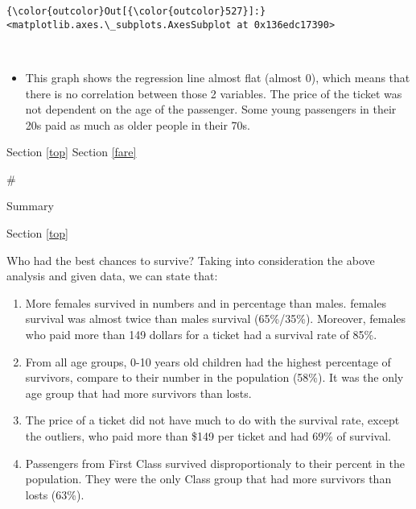 \documentclass[11pt]{article}
\providecommand{\tightlist}{%
      \setlength{\itemsep}{0pt}\setlength{\parskip}{0pt}}
\begin{document}
\begin{Verbatim}[commandchars=\\\{\}]
{\color{outcolor}Out[{\color{outcolor}527}]:} <matplotlib.axes.\_subplots.AxesSubplot at 0x136edc17390>
\end{Verbatim}
            
    \begin{center}
    \end{center}
    { \hspace*{\fill} \\}
    
    \begin{itemize}
\tightlist
\item
  This graph shows the regression line almost flat (almost 0), which
  means that there is no correlation between those 2 variables. The
  price of the ticket was not dependent on the age of the passenger.
  Some young passengers in their 20s paid as much as older people in
  their 70s.
\end{itemize}

    Section \ref{top} Section \ref{fare}

     \#

Summary

Section \ref{top}

    Who had the best chances to survive? Taking into consideration the above
analysis and given data, we can state that:

\begin{enumerate}
\def\labelenumi{\arabic{enumi}.}
\item
  More females survived in numbers and in percentage than males. females
  survival was almost twice than males survival (65\%/35\%). Moreover,
  females who paid more than 149 dollars for a ticket had a survival
  rate of 85\%.
\item
  From all age groups, 0-10 years old children had the highest
  percentage of survivors, compare to their number in the population
  (58\%). It was the only age group that had more survivors than losts.
\item
  The price of a ticket did not have much to do with the survival rate,
  except the outliers, who paid more than \$149 per ticket and had 69\%
  of survival.
\item
  Passengers from First Class survived disproportionaly to their percent
  in the population. They were the only Class group that had more
  survivors than losts (63\%).
\end{enumerate}
\end{document}
